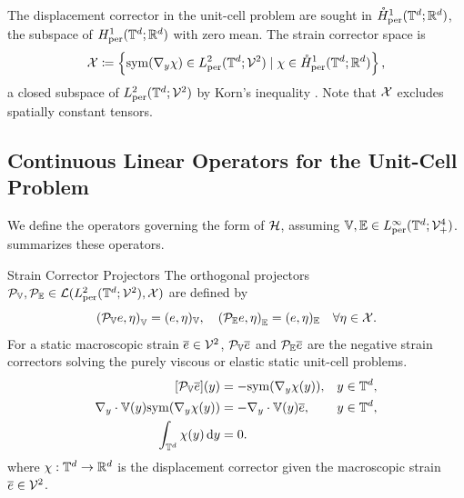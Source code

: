 \documentclass[3p, 12pt, preprint]{elsarticle}
\begin{document}
The displacement corrector in the unit-cell problem are sought in $\mathring{H}^1_{\mathrm{per}}(\mathbb{T}^d; \mathbb{R}^d)$, the subspace of $H^1_{\mathrm{per}}(\mathbb{T}^d; \mathbb{R}^d)$ with zero mean. The strain corrector
space is
\begin{equation}\label{eq:space_strain_corrector}
    {\mathcal{X}} \coloneqq \left\{ \mathrm{sym}(\nabla_y \chi) \in L^2_{\mathrm{per}}(\mathbb{T}^d; {\mathcal{V}}^2) \mid \chi \in \mathring{H}^1_{\mathrm{per}}(\mathbb{T}^d; \mathbb{R}^d) \right\},
\end{equation}
a closed subspace of $L^2_{\mathrm{per}}(\mathbb{T}^d; {\mathcal{V}}^2)$ by Korn's inequality \cite{ciarlet2021mathematical}. Note that ${\mathcal{X}}$ excludes spatially constant tensors.

\subsection{Continuous Linear Operators for the Unit-Cell Problem}\label{subsec:unit_cell_operators}

We define the operators governing the form of ${\mathcal{H}}$, assuming $\mathbb{V},\mathbb{E}\in L^{\infty}_{\mathrm{per}}(\mathbb{T}^d;{\mathcal{V}}^4_{+})$.  summarizes these operators.

\begin{namedparagraph}{Strain Corrector Projectors}
The orthogonal projectors ${\mathcal{P}}_{\mathbb{V}}, {\mathcal{P}}_{\mathbb{E}}\in \mathcal{L}(L^{2}_{\mathrm{per}}(\mathbb{T}^d;{\mathcal{V}}^2), {\mathcal{X}})$ are defined by
\begin{equation}\label{eqns:operator_P}
        \left({\mathcal{P}}_{\mathbb{V}}e,\eta\right)_{\mathbb{V}} = (e, \eta)_{\mathbb{V}},\quad \left({\mathcal{P}}_{\mathbb{E}}e, \eta\right)_{\mathbb{E}} = (e, \eta)_{\mathbb{E}}\quad \forall \eta\in {\mathcal{X}}.
\end{equation}
For a static macroscopic strain $\overline{e}\in{\mathcal{V}}^2$, ${\mathcal{P}}_{\mathbb{V}}\overline{e}$ and ${\mathcal{P}}_{\mathbb{E}}\overline{e}$ are the negative strain correctors solving the purely viscous or elastic static unit-cell problems. 
\begin{subequations}\label{eqns:viscous_cell}
\begin{align}
[{\mathcal{P}}_{\mathbb{V}}\overline{e}](y) &= -{\rm sym}(\nabla_y \chi(y)),&& y \in \mathbb{T}^d,\\
    \nabla_y \cdot \mathbb{V}(y){\rm sym}(\nabla_y \chi(y)) &= -\nabla_y \cdot \mathbb{V}(y) \overline{e}, && y \in \mathbb{T}^d, \\
    \int_{\mathbb{T}^d} \chi(y)\,\mathrm{d} y &= 0.
\end{align}
\end{subequations}
where $\chi:\mathbb{T}^d\to\mathbb{R}^{d}$ is the displacement corrector given the macroscopic strain $\overline{e}\in{\mathcal{V}}^2$.
\end{namedparagraph}
\end{document}
